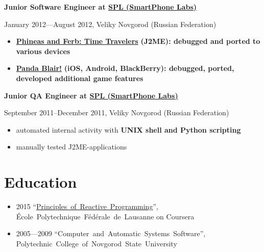 \vspace{0.5cm}

{
\fontsize{12pt}{12pt}\selectfont
\bfseries Junior Software Engineer at
\href{http://spl.co}{\bfseries SPL (SmartPhone Labs)\mdseries}
\mdseries
}

{
\fontsize{9pt}{8pt}\selectfont
January 2012---August 2012, Veliky Novgorod (Russian Federation)
}

\begin{itemize}[rightmargin=\dimexpr\linewidth-18cm-\leftmargin\relax]
\item
    \href{http://java.mob.org/game/phineas\_and\_ferb\_time\_travelers.html}
        {\bfseries Phineas and Ferb: Time Travelers\mdseries}
        \bfseries (J2ME)\mdseries:
        debugged and ported to various devices
\item
    \href{https://itunes.apple.com/us/app/panda-blair!/id500995558?mt=8}
        {\bfseries Panda Blair!\mdseries}
        \bfseries (iOS, Android, BlackBerry)\mdseries: debugged, ported, developed additional game features
\end{itemize}

\vspace{0.5cm}

{
\fontsize{12pt}{12pt}\selectfont
\bfseries Junior QA Engineer at
\href{http://spl.co}{\bfseries SPL (SmartPhone Labs)\mdseries}
\mdseries
}

{
\fontsize{9pt}{8pt}\selectfont
September 2011--December 2011, Veliky Novgorod (Russian Federation)
}

\begin{itemize}[rightmargin=\dimexpr\linewidth-17cm-\leftmargin\relax]
    \item automated internal activity with \bfseries UNIX shell \mdseries and \bfseries Python \mdseries scripting
    \item manually tested J2ME-applications
\end{itemize}

\section*{Education}
\begin{itemize}
    \item 2015 ``\href{https://www.coursera.org/account/accomplishments/verify/UJJ99REEZY}{Principles~of~Reactive~Programming}'', École~Polytechnique~Fédérale~de~Lausanne on Coursera
    \item 2005---2009 ``Computer~and~Automatic~Systems~Software'', Polytechnic~College~of~Novgorod~State~University
\end{itemize}

